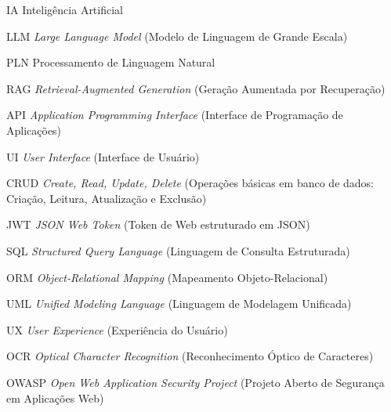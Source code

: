 \documentclass[12pt, openright, oneside, a4paper, brazil]{ads-unipac-abntex2}
\begin{document}
\listoffigures*
\cleardoublepage

\listoftables*
\cleardoublepage

\begin{siglas}
  \item[IA] Inteligência Artificial
  \item[LLM] \textit{Large Language Model} (Modelo de Linguagem de Grande Escala)
  \item[PLN] Processamento de Linguagem Natural
  \item[RAG] \textit{Retrieval-Augmented Generation} (Geração Aumentada por Recuperação)
  \item[API] \textit{Application Programming Interface} (Interface de Programação de Aplicações)
  \item[UI] \textit{User Interface} (Interface de Usuário)
  \item[CRUD] \textit{Create, Read, Update, Delete} (Operações básicas em banco de dados: Criação, Leitura, Atualização e Exclusão)
  \item[JWT] \textit{JSON Web Token} (Token de Web estruturado em JSON)
  \item[SQL] \textit{Structured Query Language} (Linguagem de Consulta Estruturada)
  \item[ORM] \textit{Object-Relational Mapping} (Mapeamento Objeto-Relacional)
  \item[UML] \textit{Unified Modeling Language} (Linguagem de Modelagem Unificada)
  \item[UX] \textit{User Experience} (Experiência do Usuário)
  \item[OCR] \textit{Optical Character Recognition} (Reconhecimento Óptico de Caracteres)
  \item[OWASP] \textit{Open Web Application Security Project} (Projeto Aberto de Segurança em Aplicações Web)
\end{siglas}

\cleardoublepage

\tableofcontents*
\cleardoublepage

\textual

\end{document}
